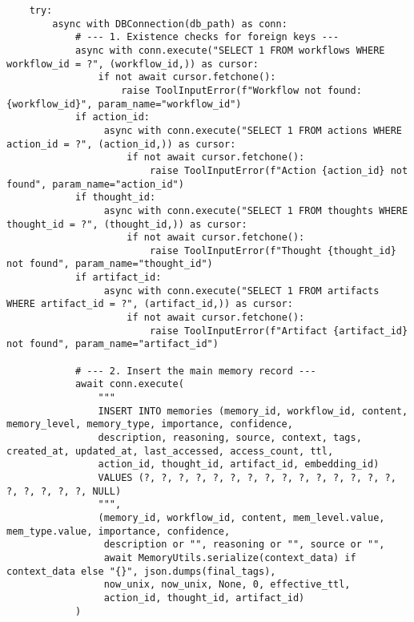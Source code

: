 \documentclass[12pt,a4paper]{article}
\begin{document}
\begin{pageablecode}
\begin{verbatim}
    try:
        async with DBConnection(db_path) as conn:
            # --- 1. Existence checks for foreign keys ---
            async with conn.execute("SELECT 1 FROM workflows WHERE workflow_id = ?", (workflow_id,)) as cursor:
                if not await cursor.fetchone():
                    raise ToolInputError(f"Workflow not found: {workflow_id}", param_name="workflow_id")
            if action_id:
                 async with conn.execute("SELECT 1 FROM actions WHERE action_id = ?", (action_id,)) as cursor:
                     if not await cursor.fetchone():
                         raise ToolInputError(f"Action {action_id} not found", param_name="action_id")
            if thought_id:
                 async with conn.execute("SELECT 1 FROM thoughts WHERE thought_id = ?", (thought_id,)) as cursor:
                     if not await cursor.fetchone():
                         raise ToolInputError(f"Thought {thought_id} not found", param_name="thought_id")
            if artifact_id:
                 async with conn.execute("SELECT 1 FROM artifacts WHERE artifact_id = ?", (artifact_id,)) as cursor:
                     if not await cursor.fetchone():
                         raise ToolInputError(f"Artifact {artifact_id} not found", param_name="artifact_id")

            # --- 2. Insert the main memory record ---
            await conn.execute(
                """
                INSERT INTO memories (memory_id, workflow_id, content, memory_level, memory_type, importance, confidence,
                description, reasoning, source, context, tags, created_at, updated_at, last_accessed, access_count, ttl,
                action_id, thought_id, artifact_id, embedding_id)
                VALUES (?, ?, ?, ?, ?, ?, ?, ?, ?, ?, ?, ?, ?, ?, ?, ?, ?, ?, ?, ?, NULL)
                """,
                (memory_id, workflow_id, content, mem_level.value, mem_type.value, importance, confidence,
                 description or "", reasoning or "", source or "",
                 await MemoryUtils.serialize(context_data) if context_data else "{}", json.dumps(final_tags),
                 now_unix, now_unix, None, 0, effective_ttl,
                 action_id, thought_id, artifact_id)
            )


\end{verbatim}
\end{pageablecode}
\end{document}
